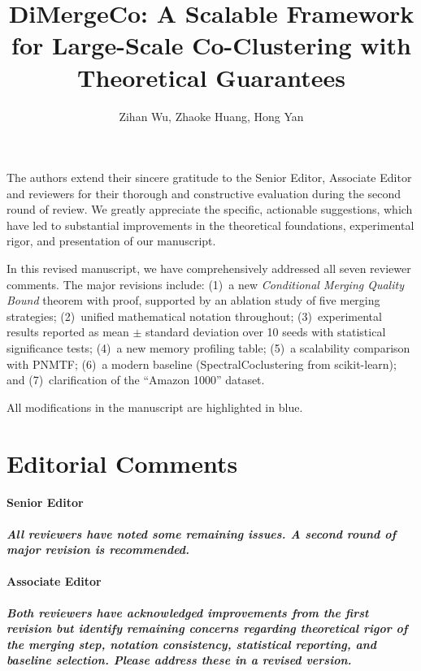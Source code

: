 \documentclass{ar2rc}
\title{
DiMergeCo: A Scalable Framework for Large-Scale Co-Clustering with Theoretical Guarantees}
\author{Zihan Wu, Zhaoke Huang, Hong Yan}
\theoremstyle{definition}
\theoremstyle{remark}
\begin{document}
\maketitle

\noindent
The authors extend their sincere gratitude to the Senior Editor, Associate Editor and reviewers for their thorough and constructive evaluation during the second round of review. We greatly appreciate the specific, actionable suggestions, which have led to substantial improvements in the theoretical foundations, experimental rigor, and presentation of our manuscript.

In this revised manuscript, we have comprehensively addressed all seven reviewer comments. The major revisions include: (1)~a new \emph{Conditional Merging Quality Bound} theorem with proof, supported by an ablation study of five merging strategies; (2)~unified mathematical notation throughout; (3)~experimental results reported as mean $\pm$ standard deviation over 10 seeds with statistical significance tests; (4)~a new memory profiling table; (5)~a scalability comparison with PNMTF; (6)~a modern baseline (SpectralCoclustering from scikit-learn); and (7)~clarification of the ``Amazon 1000'' dataset.

All modifications in the manuscript are highlighted in {\color{blue}blue}.


\section{Editorial Comments}

\paragraph{Senior Editor} \textbf{\color{blue}\textit{All reviewers have noted some remaining issues. A second round of major revision is recommended.}}


\paragraph{Associate Editor} \textbf{\color{blue}\textit{Both reviewers have acknowledged improvements from the first revision but identify remaining concerns regarding theoretical rigor of the merging step, notation consistency, statistical reporting, and baseline selection. Please address these in a revised version.}}
\end{document}

